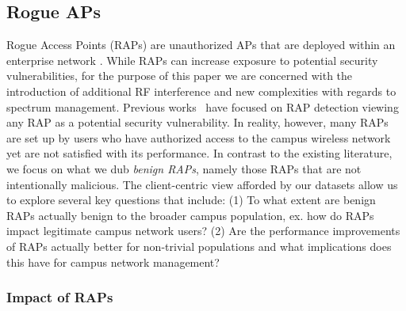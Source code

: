 \subsection{Rogue APs}
\label{subsec:rogue}

Rogue Access Points (RAPs) are unauthorized APs that are deployed within an
enterprise network \cite{beyah-rogueap11}.  While RAPs can increase exposure
to potential security vulnerabilities, for the purpose of this paper we are concerned
with the introduction of additional RF interference and new complexities with regards
to spectrum management. Previous
works~\cite{bahl2006enhancing,ma2008hybrid,wei2007passive} have focused on RAP
detection viewing any RAP as a potential security vulnerability.  In reality, however, 
many RAPs are set up by users who have authorized access to the campus wireless 
network yet are not satisfied with its performance. In contrast to the existing literature,
we focus on what we dub \emph{benign RAPs}, namely those RAPs that are not
intentionally malicious.  The client-centric view afforded by our datasets allow us to explore 
several key questions that include: (1) To what extent are benign RAPs actually benign 
to the broader campus population, ex. how do RAPs impact legitimate campus network
users? (2) Are the performance improvements of RAPs actually better for non-trivial
populations and what implications does this have for campus network management?



\subsubsection{Impact of RAPs}
\label{subsec:rap_impact}

